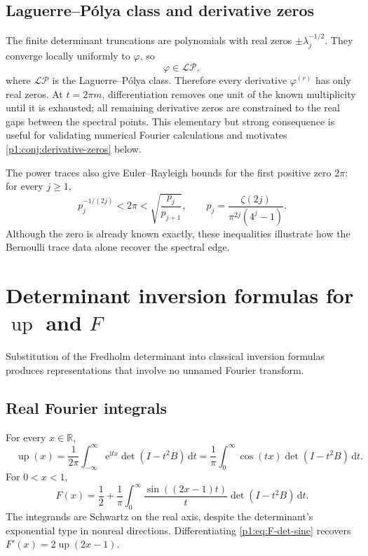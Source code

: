 \documentclass[11pt,oneside]{article}
\theoremstyle{definition}
\newcommand{\dd}{\,\mathrm d}
\newcommand{\e}{\mathrm e}
\newcommand{\ii}{\mathrm i}
\newcommand{\R}{\mathbb R}
\newcommand{\Up}{\operatorname{up}}
\newcommand{\phiF}{\varphi}
\begin{document}
\subsection{Laguerre--P\'olya class and derivative zeros}

The finite determinant truncations are polynomials with real zeros
\(\pm\lambda_j^{-1/2}\).  They converge locally uniformly to \(\phiF\), so
\begin{equation}
 \phiF\in\mathcal{LP},
 \label{p1:eq:phi-LP}
\end{equation}
where \(\mathcal{LP}\) is the Laguerre--P\'olya class.  Therefore every derivative
\(\phiF^{(r)}\) has only real zeros.  At \(t=2\pi m\), differentiation removes one
unit of the known multiplicity until it is exhausted; all remaining derivative zeros
are constrained to the real gaps between the spectral points.  This elementary but
strong consequence is useful for validating numerical Fourier calculations and
motivates \cref{p1:conj:derivative-zeros} below.

The power traces also give Euler--Rayleigh bounds for the first positive zero
\(2\pi\): for every \(j\ge1\),
\begin{equation}
 p_j^{-1/(2j)}<2\pi<\sqrt{\frac{p_j}{p_{j+1}}},
 \qquad
 p_j=\frac{\zeta(2j)}{\pi^{2j}(4^j-1)}.
 \label{p1:eq:Euler-Rayleigh}
\end{equation}
Although the zero is already known exactly, these inequalities illustrate how the
Bernoulli trace data alone recover the spectral edge.

\section{Determinant inversion formulas for \(\Up\) and \(F\)}
\label{p1:sec:det-inversion}

Substitution of the Fredholm determinant into classical inversion formulas produces
representations that involve no unnamed Fourier transform.

\subsection{Real Fourier integrals}

For every \(x\in\R\),
\begin{equation}
 \boxed{\quad
 \Up(x)=\frac1{2\pi}\int_{-\infty}^{\infty}
 \e^{\ii tx}\det(I-t^2B)\dd t
 =\frac1\pi\int_0^\infty\cos(tx)\det(I-t^2B)\dd t.
 \quad}
 \label{p1:eq:up-det-Fourier}
\end{equation}
For \(0<x<1\),
\begin{equation}
 \boxed{\quad
 F(x)=\frac12+\frac1\pi\int_0^\infty
 \frac{\sin((2x-1)t)}t\det(I-t^2B)\dd t.
 \quad}
 \label{p1:eq:F-det-sine}
\end{equation}
The integrands are Schwartz on the real axis, despite the determinant's exponential
type in nonreal directions.  Differentiating \eqref{p1:eq:F-det-sine} recovers
\(F'(x)=2\Up(2x-1)\).
\end{document}
